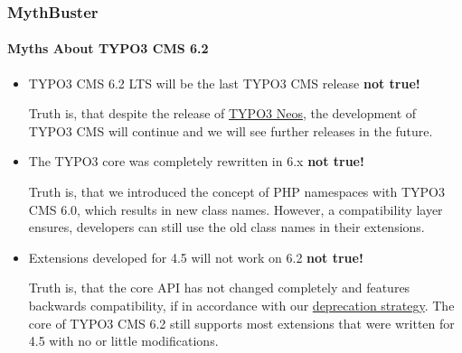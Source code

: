 \begin{frame}[fragile]
	\frametitle{MythBuster}
	\framesubtitle{Myths About TYPO3 CMS 6.2}

	\begin{itemize}
		\item TYPO3 CMS 6.2 LTS will be the last TYPO3 CMS release
			\tabto{9cm}\color{red}\textbf{\textrightarrow not true!}\color{black}

			\smaller
				Truth is, that despite the release of \href{http://neos.typo3.org}{TYPO3 Neos}, the development of TYPO3 CMS will continue and we will see further releases in the future.
			\normalsize

		\item The TYPO3 core was completely rewritten in 6.x
			\tabto{9cm}\color{red}\textbf{\textrightarrow not true!}\color{black}

			\smaller
				Truth is, that we introduced the concept of PHP namespaces with TYPO3 CMS 6.0, which results in new class names. However, a compatibility layer ensures, developers can still use the old class names in their extensions.
			\normalsize

		\item Extensions developed for 4.5 will not work on 6.2
			\tabto{9cm}\color{red}\textbf{\textrightarrow not true!}\color{black}

			\smaller
				Truth is, that the core API has not changed completely and features backwards compatibility, if in accordance with our \href{http://forge.typo3.org/projects/typo3v4-core/wiki/CoreDevPolicy}{deprecation strategy}. The core of TYPO3 CMS 6.2 still supports most extensions that were written for 4.5 with no or little modifications.
			\normalsize

	\end{itemize}

\end{frame}


